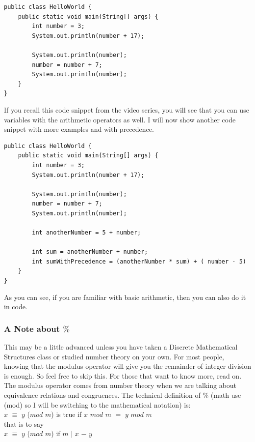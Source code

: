\documentclass[11]{article}
\begin{document}
\begin{lstlisting}
public class HelloWorld {
    public static void main(String[] args) {
        int number = 3;
        System.out.println(number + 17);

        System.out.println(number);
        number = number + 7;
        System.out.println(number);
    }
}

\end{lstlisting}

If you recall this code snippet from the video series, you will see that you can use variables with the arithmetic operators as well. I will now show another code snippet with more examples and with precedence.

\begin{lstlisting}
public class HelloWorld {
    public static void main(String[] args) {
        int number = 3;
        System.out.println(number + 17);

        System.out.println(number);
        number = number + 7;
        System.out.println(number);
        
        int anotherNumber = 5 + number;
        
        int sum = anotherNumber + number;
        int sumWithPrecedence = (anotherNumber * sum) + ( number - 5)
    }
}

\end{lstlisting}
As you can see, if you are familiar with basic arithmetic, then you can also do it in code.

\subsubsection{A Note about $\%$}
This may be a little advanced unless you have taken a Discrete Mathematical Structures class or studied number theory on your own. For most people, knowing that the modulus operator will give you the remainder of integer division is enough. So feel free to skip this. For those that want to know more, read on.\\

The modulus operator comes from number theory when we are talking about equivalence relations and congruences. The technical definition of $\%$ (math use (mod) so I will be switching to the mathematical notation) is:\\
$x$ $\equiv$ $y$ ($mod$ $m$) is true if $x$ $mod$ $m$ $=$ $y$ $mod$ $m$\\
that is to say\\
$x$ $\equiv$ $y$ ($mod$ $m$) if $m$ $|$ $x$ $-$ $y$\\
\end{document}
